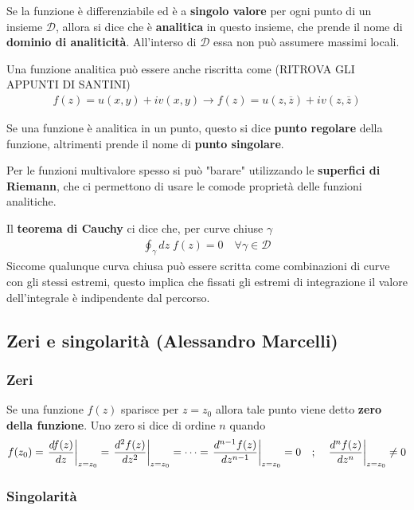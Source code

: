 Se la funzione è differenziabile ed è a \textbf{singolo valore} per ogni punto di un insieme $\mathcal{D}$, allora si dice che è \textbf{analitica} in questo insieme, che prende il nome di \textbf{dominio di analiticità}. All'interso di $\mathcal{D}$ essa non può assumere massimi locali.

Una funzione analitica può essere anche riscritta come (RITROVA GLI APPUNTI DI SANTINI)
\begin{align}
	f(z) = u(x,y) + iv(x,y) \to f(z) = u(z,\overline{z}) + i v(z,\overline{z})
\end{align}

Se una funzione è analitica in un punto, questo si dice \textbf{punto regolare} della funzione, altrimenti prende il nome di \textbf{punto singolare}.

Per le funzioni multivalore spesso si può "barare" utilizzando le \textbf{superfici di Riemann}, che ci permettono di usare le comode proprietà delle funzioni analitiche.

Il \textbf{teorema di Cauchy} ci dice che, per curve chiuse $\gamma$
\begin{align}
	\oint_\gamma dz \; f(z) = 0 \quad \forall \gamma \in \mathcal{D}
\end{align}
Siccome qualunque curva chiusa può essere scritta come combinazioni di curve con gli stessi estremi, questo implica che fissati gli estremi di integrazione il valore dell'integrale è indipendente dal percorso.


\newpage
\subsection{Zeri e singolarità (Alessandro Marcelli)}

\subsubsection{Zeri}

Se una funzione $f(z)$ sparisce per $z=z_0$ allora tale punto viene detto \textbf{zero della funzione}. Uno zero si dice di ordine $n$ quando
\begin{align}
	f(z_0) = \left. \frac{df(z)}{dz} \right|_{z=z_0} =  \left. \frac{d^2 f(z)}{dz^2} \right|_{z=z_0} = \dots = \left. \frac{d^{n-1}f(z)}{dz^{n-1}} \right|_{z=z_0} = 0 \quad ; \quad
	\left. \frac{d^{n}f(z)}{dz^{n}} \right|_{z=z_0} \neq 0
\end{align}

\subsubsection{Singolarità}

